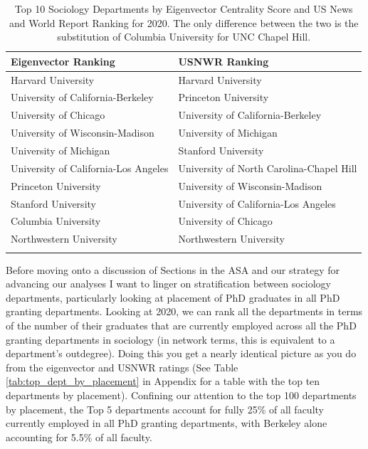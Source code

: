 \documentclass{article}
\begin{document}
\begin{table}[ht]
\caption{Top 10 Sociology Departments by Eigenvector Centrality Score and US News and World Report Ranking for 2020. The only difference between the two is the substitution of Columbia University for UNC Chapel Hill.}
\smallskip
\centering
\begin{tabular}{ll}
  \hline
Eigenvector Ranking & USNWR Ranking \\
  \hline
Harvard University & Harvard University \\
  University of California-Berkeley & Princeton University \\
  University of Chicago & University of California-Berkeley \\
  University of Wisconsin-Madison & University of Michigan \\
  University of Michigan & Stanford University \\
  University of California-Los Angeles & University of North Carolina-Chapel Hill \\
  Princeton University & University of Wisconsin-Madison \\
  Stanford University & University of California-Los Angeles \\
  Columbia University & University of Chicago \\
  Northwestern University & Northwestern University \\
   \hline
   \label{tab:top_ten_by_eigen_usnwr}
\end{tabular}
\end{table}

Before moving onto a discussion of Sections in the ASA and our strategy for advancing our analyses I want to linger on stratification between sociology departments, particularly looking at placement of PhD graduates in all PhD granting departments. Looking at 2020, we can rank all the departments in terms of the number of their graduates that are currently employed across all the PhD granting departments in sociology (in network terms, this is equivalent to a department's outdegree). Doing this you get a nearly identical picture as you do from the eigenvector and USNWR ratings (See Table \ref{tab:top_dept_by_placement} in Appendix for a table with the top ten departments by placement). Confining our attention to the top 100 departments by placement, the Top 5 departments account for fully 25\% of all faculty currently employed in all PhD granting departments, with Berkeley alone accounting for 5.5\% of all faculty.
\end{document}
